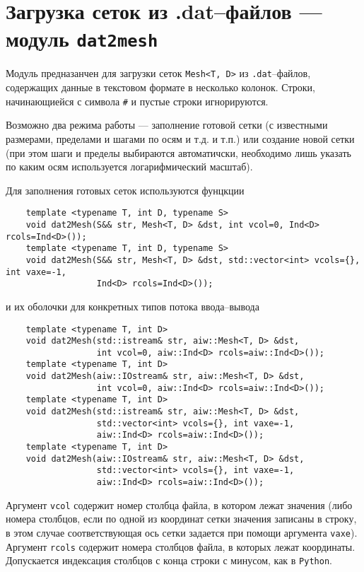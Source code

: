\section{Загрузка сеток из {.dat}--файлов --- модуль {\tt dat2mesh}}\label{dat2mesh:sec}
Модуль предназанчен для загрузки сеток \verb'Mesh<T, D>' из \verb'.dat'--файлов,
содержащих данные в текстовом формате в несколько колонок. Строки, начинающиейся с символа \verb'#' и пустые строки игнорируются.

Возможно два режима работы --- заполнение готовой сетки (с известными размерами, пределами и шагами по осям и т.д. и т.п.) или создание новой
сетки (при этом шаги и пределы выбираются автоматичски, необходимо лишь указать по каким осям используется логарифмический масштаб).

Для заполнения готовых сеток используются фунцкции 
\begin{verbatim}
    template <typename T, int D, typename S> 
    void dat2Mesh(S&& str, Mesh<T, D> &dst, int vcol=0, Ind<D> rcols=Ind<D>());
    template <typename T, int D, typename S> 
    void dat2Mesh(S&& str, Mesh<T, D> &dst, std::vector<int> vcols={}, int vaxe=-1, 
                  Ind<D> rcols=Ind<D>());
\end{verbatim}
и их оболочки для конкретных типов потока ввода--вывода		
\begin{verbatim}
    template <typename T, int D> 
    void dat2Mesh(std::istream& str, aiw::Mesh<T, D> &dst, 
                  int vcol=0, aiw::Ind<D> rcols=aiw::Ind<D>());
    template <typename T, int D> 
    void dat2Mesh(aiw::IOstream& str, aiw::Mesh<T, D> &dst, 
                  int vcol=0, aiw::Ind<D> rcols=aiw::Ind<D>());
    template <typename T, int D> 
    void dat2Mesh(std::istream& str, aiw::Mesh<T, D> &dst, 
                  std::vector<int> vcols={}, int vaxe=-1, 
                  aiw::Ind<D> rcols=aiw::Ind<D>());
    template <typename T, int D> 
    void dat2Mesh(aiw::IOstream& str, aiw::Mesh<T, D> &dst, 
                  std::vector<int> vcols={}, int vaxe=-1, 
                  aiw::Ind<D> rcols=aiw::Ind<D>());
\end{verbatim}
Аргумент \verb'vcol' содержит номер столбца файла, в котором лежат значения (либо номера столбцов, если по одной из координат сетки значения записаны в строку,
в этом случае соответствующая ось сетки задается при помощи аргумента \verb'vaxe').
Аргумент \verb'rcols' содержит номера столбцов файла, в которых лежат координаты. Допускается индексация столбцов с конца строки с минусом, как в \verb'Python'.


